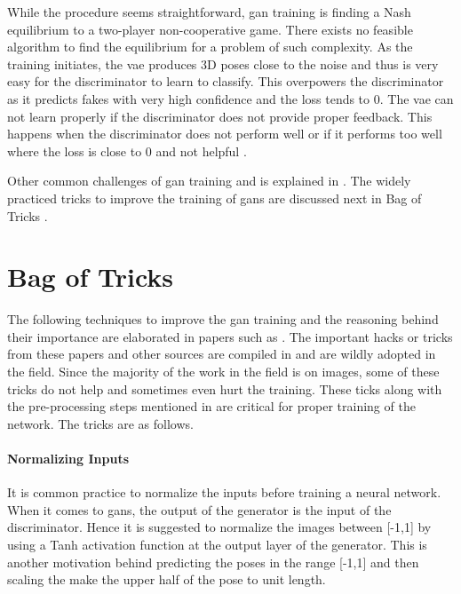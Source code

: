 While the procedure seems straightforward, \ac{gan} training is finding a Nash equilibrium to a two-player non-cooperative game. There exists no feasible algorithm to find the equilibrium for a problem of such complexity\cite{improved_gan}. As the training initiates, the \ac{vae} produces 3D poses close to the noise and thus is very easy for the discriminator to learn to classify. This overpowers the discriminator as it predicts fakes with very high confidence and the loss tends to 0. The \ac{vae} can not learn properly if the discriminator does not provide proper feedback. This happens when the discriminator does not perform well or if it performs too well where the loss is close to 0 and not helpful \cite{openaigan2wgan}. 

Other common challenges of \ac{gan} training and is explained in . The widely practiced tricks to improve the training of \acp{gan} are discussed next in Bag of Tricks . 



\section{Bag of Tricks}
\label{sec:bag_of_tricks}
The following techniques to improve the \ac{gan} training and the reasoning behind their importance are elaborated in papers such as \cite{soumith2017wasserstein,goodfellow2014generative,openaigan2wgan,improved_gan}. The important hacks or tricks from these papers and other sources are compiled in \cite{gan_hacks} and are wildly adopted in the field. Since the majority of the work in the field is on images, some of these tricks do not help and sometimes even hurt the training. These ticks along with the pre-processing steps mentioned in  are critical for proper training of the network. The tricks are as follows. %
 
\paragraph{Normalizing Inputs} 
It is common practice to normalize the inputs before training a neural network. When it comes to \acp{gan}, the output of the generator is the input of the discriminator. Hence it is suggested to normalize the images between [-1,1] by using a Tanh activation function at the output layer of the generator. This is another motivation behind predicting the poses in the range [-1,1] and then scaling the make the upper half of the pose to unit length.

